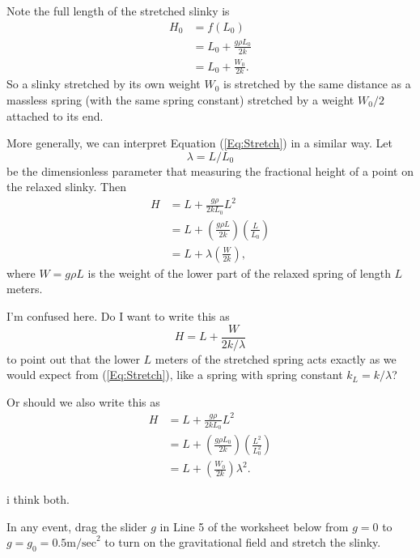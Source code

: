 \documentclass{ximera}
\begin{document}
Note the full length of the stretched slinky is
\begin{align*}
   H_0 &= f(L_0)  \\
          &= L_0 + \frac{g\rho L_0}{2k} \\
          &= L_0 +  \frac{W_0}{2k}  .
\end{align*}
So a slinky stretched by its own weight $W_0$ is stretched by the same distance as a massless spring (with the same spring constant) stretched by a weight $W_0/2$ attached to its end.

More generally, we can interpret Equation (\ref{Eq:Stretch}) in a similar way. Let
\[
    \lambda = L/L_0
\]
be the dimensionless parameter that measuring the fractional height of a point on the relaxed slinky. Then 
\begin{align*}
       H  & = L + \frac{g\rho}{2kL_0}L^2 \\
           & =  L +   \left(\frac{g\rho L}{2k} \right) \left(\frac{L}{L_0}\right) \\
           & =  L + \lambda  \left(  \frac{W}{2k} \right) ,
\end{align*} 
where $W=g\rho L$ is the weight of the lower part of the relaxed spring of length $L$ meters.  

I'm confused here. Do I want to write this as
\[
           H = L +\frac{W}{2k/\lambda} 
\]
to point out that the lower $L$ meters of the stretched spring acts exactly as we would expect from (\ref{Eq:Stretch}), like a spring with spring constant $k_L = k/\lambda$?

Or should we also write this as
\begin{align*}
        H  & = L + \frac{g\rho}{2kL_0}L^2 \\
            & =  L + \left( \frac{g\rho L_0}{2k} \right) \left( \frac{L^2}{L_0^2} \right) \\
            & = L + \left( \frac{W_0}{2k} \right) \lambda^2 .
\end{align*}

i think both.

In any event, drag the slider $g$ in Line 5 of the worksheet below from $g=0$ to $g=g_0 = 0.5 \text{m/sec}^2$ to turn on the gravitational field and stretch the slinky. 

\begin{onlineOnly}
    \begin{center}
\end{center}
\end{onlineOnly}
\end{document}
